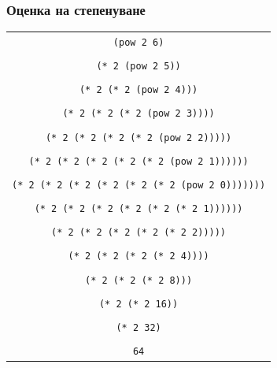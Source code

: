 \documentclass{beamer}
\begin{document}
\begin{frame}
  \frametitle{Оценка на степенуване}

  \begin{center}
    \tiny
    \begin{tabular}{c}
      \tt{(pow 2 6)}\\
      \nxt{\bda\\
      \tt{(* 2 (pow 2 5))}\\
      \nxt{\bda\\
      \tt{(* 2 (* 2 (pow 2 4)))}\\
      \nxt{\bda\\
      \tt{(* 2 (* 2 (* 2 (pow 2 3))))}\\
      \nxt{\bda\\
      \tt{(* 2 (* 2 (* 2 (* 2 (pow 2 2)))))}\\
      \nxt{\bda\\
      \tt{(* 2 (* 2 (* 2 (* 2 (* 2 (pow 2 1))))))}\\
      \nxt{\bda\\
      \tt{(* 2 (* 2 (* 2 (* 2 (* 2 (* 2 (pow 2 0)))))))}\\
      \nxt{\bda\\
      \tt{(* 2 (* 2 (* 2 (* 2 (* 2 (* 2 1))))))}\\
      \nxt{\bda\\
      \tt{(* 2 (* 2 (* 2 (* 2 (* 2 2)))))}\\
      \nxt{\bda\\
      \tt{(* 2 (* 2 (* 2 (* 2 4))))}\\
      \nxt{\bda\\
      \tt{(* 2 (* 2 (* 2 8)))}\\
      \nxt{\bda\\
      \tt{(* 2 (* 2 16))}\\
      \nxt{\bda\\
      \tt{(* 2 32)}\\
      \nxt{\bda\\
      \tt{64}}}}}}}}}}}}}}
    \end{tabular}
  \end{center}\ \\
\end{frame}
\end{document}
